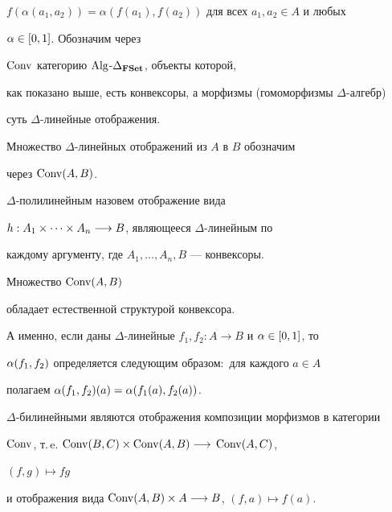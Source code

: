 $f(\alpha(a_1,a_2))=\alpha(f(a_1),f(a_2))$ для всех $a_1,a_2\in A$ и любых


$\alpha\in [0,1]$. Обозначим через


$\operatorname{Conv}$ категорию $\operatorname{Alg}$-$\Delta_{\bold{FSet}}$, объекты которой,


как показано выше, есть конвексоры, а морфизмы (гомоморфизмы $\Delta$-алгебр)


суть $\Delta$-линейные отображения.


Множество $\Delta$-линейных отображений из $A$ в $B$ обозначим


через $\operatorname{Conv}(A,B)$.\;


$\Delta$-полилинейным назовем отображение вида


$h:A_1\times\dotsb\times A_n\overset{}{\longrightarrow}{} B$, являющееся $\Delta$-линейным по


каждому аргументу, где $A_1,\dotsc, A_n, B$ --- конвексоры.





\begin{lem}


Множество $\operatorname{Conv}(A,B)$


обладает естественной структурой конвексора.


А именно, если даны $\Delta$-линейные $f_1,f_2:A\to B$ и $\alpha\in [0,1]$, то


$\alpha(f_1,f_2)$ определяется следующим образом\/$:$ для каждого $a\in A$


полагаем $\alpha(f_1,f_2)(a)=\alpha(f_1(a),f_2(a))$.\;


$\Delta$-билинейными являются отображения композиции морфизмов в категории


$\operatorname{Conv}$, т.\,e. $\operatorname{Conv}(B,C)\times \operatorname{Conv}(A,B)\overset{}{\longrightarrow}{} \operatorname{Conv}(A,C)$,


$(f,g)\mapsto fg$


и отображения вида $\operatorname{Conv}(A,B)\times A\overset{}{\longrightarrow}{} B$, $(f,a)\mapsto f(a)$.


\end{lem}






